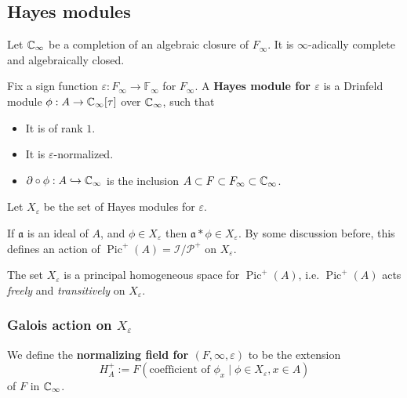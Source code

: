 \documentclass{article}
\newcommand{\F}{\mathbb{F}}
\DeclareMathOperator{\pic}{Pic}
\begin{document}
\subsection{Hayes modules}

Let $\mathbb{C}_\infty$ be a completion of an algebraic closure of $F_\infty$.
It is $\infty$-adically complete and algebraically closed.

Fix a sign function $\varepsilon : F_\infty\to\F_\infty$ for $F_\infty$.
A \textbf{Hayes module for $\varepsilon$}
is a Drinfeld module $\phi : A\to \mathbb{C}_\infty[\tau]$ over $\mathbb{C}_\infty$,
such that\begin{itemize}
\item It is of rank $1$.
\item It is $\varepsilon$-normalized.
\item $\partial\circ\phi : A\hookrightarrow\mathbb{C}_\infty$ is the inclusion $A\subset F\subset F_\infty\subset \mathbb{C}_\infty$.
\end{itemize}
Let $X_\varepsilon$ be the set of Hayes modules for $\varepsilon$.


If $\mathfrak{a}$ is an ideal of $A$, and $\phi\in X_\varepsilon$
then $\mathfrak{a}*\phi\in X_\varepsilon$.
By some discussion before,
this defines an action of $\pic^+(A) = \mathcal{I}/\mathcal{P}^+$
on $X_\varepsilon$.
\begin{proposition}\label{action of Pic+ on the set of Hayes modules}
    The set $X_\varepsilon$ is a principal homogeneous space for $\pic^+(A)$, i.e. $\pic^+(A)$ acts \textit{freely} and \textit{transitively} on $X_\varepsilon$.
\end{proposition}
\subsubsection{Galois action on \texorpdfstring{$X_\varepsilon$}{Xepsilon}}
We define the \textbf{normalizing field for $(F, \infty, \varepsilon)$} to be the extension \[H_A^+ := F\left( \text{coefficient of }\phi_x\mid \phi\in X_\varepsilon, x\in A \right)\]
of $F$ in $\mathbb{C}_\infty$.
\end{document}
